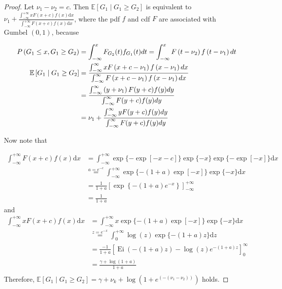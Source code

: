 \begin{proof}
    Let $\nu_1-\nu_2 = c$. Then $\mathbb{E}\left[G_1 \mid G_1\geq G_2\right]$ is equivalent to $\nu_1 + \frac{\int_{-\infty}^{+\infty} x F(x+c) f(x) \mathrm{d} x}{\int_{-\infty}^{+\infty} F(x+c) f(x) \mathrm{d} x}$, where the pdf $f$ and cdf $F$ are associated with $\text{Gumbel }(0, 1)$, because

    \begin{align}
        P\left(G_1 \leq x, G_1 \geq G_2\right)&=\int_{-\infty}^x F_{G_2}(t) f_{G_1}(t) d t=\int_{-\infty}^x F\left(t-\nu_2\right) f\left(t-\nu_1\right) d t\notag
        \\
        \mathbb{E}\left[G_1 \mid G_1 \geq G_2\right]&=\frac{\int_{-\infty}^{\infty} x F\left(x+c-\nu_1\right) f\left(x-\nu_1\right) d x}{\int_{-\infty}^{\infty} F\left(x+c-\nu_1\right) f\left(x-\nu_1\right) d x}\notag
        \\
        &=\frac{\int_{-\infty}^{\infty}\left(y+\nu_1\right) F(y+c) f(y) d y}{\int_{-\infty}^{\infty} F(y+c) f(y) d y} \notag
        \\
        &=\nu_1+\frac{\int_{-\infty}^{\infty} y F(y+c) f(y) d y}{\int_{-\infty}^{\infty} F(y+c) f(y) d y} \notag
    \end{align}

    
    Now note that 

    $\begin{aligned} \int_{-\infty}^{+\infty} F(x+c) f(x) \mathrm{d} x & =\int_{-\infty}^{+\infty} \exp \{-\exp [-x-c]\} \exp \{-x\} \exp \{-\exp [-x]\} \mathrm{d} x \\ & \stackrel{a=e^{-c}}{=} \int_{-\infty}^{+\infty} \exp \{-(1+a) \exp [-x]\} \exp \{-x\} \mathrm{d} x \\ & =\frac{1}{1+a}\left[\exp \left\{-(1+a) e^{-x}\right\}\right]_{-\infty}^{+\infty} \\ & =\frac{1}{1+a}\end{aligned}$
    \\
    and
    \\
    $\begin{aligned}  \int_{-\infty}^{+\infty} x F(x+c) f(x) \mathrm{d} x&=\int_{-\infty}^{+\infty} x \exp \{-(1+a) \exp [-x]\} \exp \{-x\} \mathrm{d} x \\ & \stackrel{z=e^{-x}}{=} \int_0^{+\infty} \log (z) \exp \{-(1+a) z\} \mathrm{d} z \\ & =\frac{-1}{1+a}\left[\operatorname{Ei}(-(1+a) z)-\log (z) e^{-(1+a) z}\right]_0^{\infty} \\ & =\frac{\gamma+\log (1+a)}{1+a} \\ & \end{aligned}$
    \\
    Therefore, $\mathbb{E}\left[G_1 \mid G_1\geq G_2\right]=\gamma + \nu_k+ \log \left( 1+ e^{\left(-(\nu_1-\nu_2)\right)} \right)$ holds.
\end{proof}

